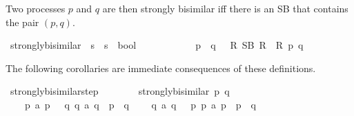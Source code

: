 \begin{isabellebody}
\begin{isamarkuptext}%
\pagebreak
Two processes $p$ and $q$ are then strongly bisimilar iff there is an SB that contains the pair $(p, q)$.%
\end{isamarkuptext}\isamarkuptrue%
\isamarkupfalse%
\ strongly{\isacharunderscore}{\kern0pt}bisimilar\ {\isacharcolon}{\kern0pt}{\isacharcolon}{\kern0pt}\ {\isacartoucheopen}{\isacharprime}{\kern0pt}s\ {\isasymRightarrow}\ {\isacharprime}{\kern0pt}s\ {\isasymRightarrow}\ bool{\isacartoucheclose}\ \isanewline
\ \ {\isacharparenleft}{\kern0pt}{\isacartoucheopen}{\isacharunderscore}{\kern0pt}\ {\isasymleftrightarrow}\ {\isacharunderscore}{\kern0pt}{\isacartoucheclose}\ {\isacharbrackleft}{\kern0pt}{}{}{\isacharcomma}{\kern0pt}\ {}{}{\isacharbrackright}{\kern0pt}\ {}{}{\isacharparenright}{\kern0pt}\isanewline
\ \ \ {\isacartoucheopen}p\ {\isasymleftrightarrow}\ q\ {\isasymequiv}\ {\isasymexists}\ R{\isachardot}{\kern0pt}\ SB\ R\ {\isasymand}\ R\ p\ q{\isacartoucheclose}%
\begin{isamarkuptext}%
The following corollaries are immediate consequences of these definitions.%
\end{isamarkuptext}\isamarkuptrue%
\isamarkupfalse%
\ strongly{\isacharunderscore}{\kern0pt}bisimilar{\isacharunderscore}{\kern0pt}step{\isacharcolon}{\kern0pt}\isanewline
\ \ \ \isanewline
\ \ \ \ {\isacartoucheopen}strongly{\isacharunderscore}{\kern0pt}bisimilar\ p\ q{\isacartoucheclose}\isanewline
\ \ \isanewline
\ \ \ \ {\isacartoucheopen}p\ {\isasymlongmapsto}a\ p{\isacharprime}{\kern0pt}\ {\isasymLongrightarrow}\ {\isacharparenleft}{\kern0pt}{\isasymexists}\ q{\isacharprime}{\kern0pt}{\isachardot}{\kern0pt}\ {\isacharparenleft}{\kern0pt}q\ {\isasymlongmapsto}a\ q{\isacharprime}{\kern0pt}{\isacharparenright}{\kern0pt}\ {\isasymand}\ p{\isacharprime}{\kern0pt}\ {\isasymleftrightarrow}\ q{\isacharprime}{\kern0pt}{\isacharparenright}{\kern0pt}{\isacartoucheclose}\isanewline
\ \ \ \ {\isacartoucheopen}q\ {\isasymlongmapsto}a\ q{\isacharprime}{\kern0pt}\ {\isasymLongrightarrow}\ {\isacharparenleft}{\kern0pt}{\isasymexists}\ p{\isacharprime}{\kern0pt}{\isachardot}{\kern0pt}\ {\isacharparenleft}{\kern0pt}p\ {\isasymlongmapsto}a\ p{\isacharprime}{\kern0pt}{\isacharparenright}{\kern0pt}\ {\isasymand}\ p{\isacharprime}{\kern0pt}\ {\isasymleftrightarrow}\ q{\isacharprime}{\kern0pt}{\isacharparenright}{\kern0pt}{\isacartoucheclose}\isanewline

\end{isabellebody}
